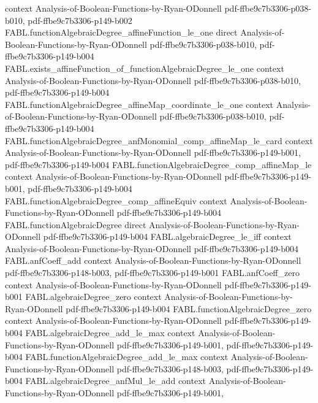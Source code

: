 \begin{theorem}
  {context}
  {Analysis-of-Boolean-Functions-by-Ryan-ODonnell}
  {pdf-ffbe9c7b3306-p038-b010,
    pdf-ffbe9c7b3306-p149-b002}
\proofstep
  {FABL.functionAlgebraicDegree_affineFunction_le_one}
  {direct}
  {Analysis-of-Boolean-Functions-by-Ryan-ODonnell}
  {pdf-ffbe9c7b3306-p038-b010,
    pdf-ffbe9c7b3306-p149-b004}
\proofstep
  {FABL.exists_affineFunction_of_functionAlgebraicDegree_le_one}
  {context}
  {Analysis-of-Boolean-Functions-by-Ryan-ODonnell}
  {pdf-ffbe9c7b3306-p038-b010,
    pdf-ffbe9c7b3306-p149-b004}
\proofstep
  {FABL.functionAlgebraicDegree_affineMap_coordinate_le_one}
  {context}
  {Analysis-of-Boolean-Functions-by-Ryan-ODonnell}
  {pdf-ffbe9c7b3306-p038-b010,
    pdf-ffbe9c7b3306-p149-b004}
\proofstep
  {FABL.functionAlgebraicDegree_anfMonomial_comp_affineMap_le_card}
  {context}
  {Analysis-of-Boolean-Functions-by-Ryan-ODonnell}
  {pdf-ffbe9c7b3306-p149-b001,
    pdf-ffbe9c7b3306-p149-b004}
\proofstep
  {FABL.functionAlgebraicDegree_comp_affineMap_le}
  {context}
  {Analysis-of-Boolean-Functions-by-Ryan-ODonnell}
  {pdf-ffbe9c7b3306-p149-b001,
    pdf-ffbe9c7b3306-p149-b004}
\proofstep
  {FABL.functionAlgebraicDegree_comp_affineEquiv}
  {context}
  {Analysis-of-Boolean-Functions-by-Ryan-ODonnell}
  {pdf-ffbe9c7b3306-p149-b004}
\proofstep
  {FABL.functionAlgebraicDegree}
  {direct}
  {Analysis-of-Boolean-Functions-by-Ryan-ODonnell}
  {pdf-ffbe9c7b3306-p149-b004}
\proofstep
  {FABL.algebraicDegree_le_iff}
  {context}
  {Analysis-of-Boolean-Functions-by-Ryan-ODonnell}
  {pdf-ffbe9c7b3306-p149-b004}
\proofstep
  {FABL.anfCoeff_add}
  {context}
  {Analysis-of-Boolean-Functions-by-Ryan-ODonnell}
  {pdf-ffbe9c7b3306-p148-b003,
    pdf-ffbe9c7b3306-p149-b001}
\proofstep
  {FABL.anfCoeff_zero}
  {context}
  {Analysis-of-Boolean-Functions-by-Ryan-ODonnell}
  {pdf-ffbe9c7b3306-p149-b001}
\proofstep
  {FABL.algebraicDegree_zero}
  {context}
  {Analysis-of-Boolean-Functions-by-Ryan-ODonnell}
  {pdf-ffbe9c7b3306-p149-b004}
\proofstep
  {FABL.functionAlgebraicDegree_zero}
  {context}
  {Analysis-of-Boolean-Functions-by-Ryan-ODonnell}
  {pdf-ffbe9c7b3306-p149-b004}
\proofstep
  {FABL.algebraicDegree_add_le_max}
  {context}
  {Analysis-of-Boolean-Functions-by-Ryan-ODonnell}
  {pdf-ffbe9c7b3306-p149-b001,
    pdf-ffbe9c7b3306-p149-b004}
\proofstep
  {FABL.functionAlgebraicDegree_add_le_max}
  {context}
  {Analysis-of-Boolean-Functions-by-Ryan-ODonnell}
  {pdf-ffbe9c7b3306-p148-b003,
    pdf-ffbe9c7b3306-p149-b004}
\proofstep
  {FABL.algebraicDegree_anfMul_le_add}
  {context}
  {Analysis-of-Boolean-Functions-by-Ryan-ODonnell}
  {pdf-ffbe9c7b3306-p149-b001,
}
\end{theorem}
